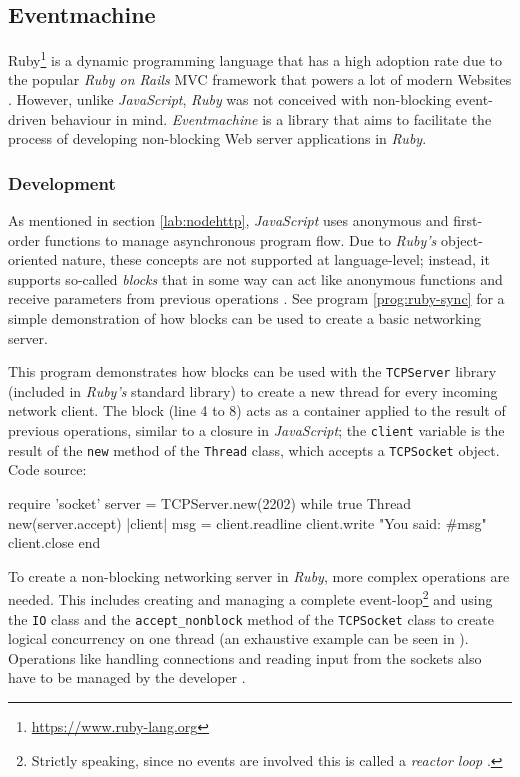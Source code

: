 \subsection{Eventmachine}
\label{sec:eventmachine}
Ruby\footnote{\url{https://www.ruby-lang.org}} is a dynamic programming language that has a high adoption rate due to the popular \textit{Ruby on Rails} MVC framework that powers a lot of modern Websites \cite[p. 11]{Orsini2008}. However, unlike \textit{JavaScript}, \textit{Ruby} was not conceived with non-blocking event-driven behaviour in mind. \textit{Eventmachine} is a library that aims to facilitate the process of developing non-blocking Web server applications in \textit{Ruby}.

\subsubsection*{Development}
As mentioned in section \ref{lab:nodehttp}, \textit{JavaScript} uses anonymous and first-order functions to manage asynchronous program flow. Due to \textit{Ruby's} object-oriented nature, these concepts are not supported at language-level; instead, it supports so-called \textit{blocks} that in some way can act like anonymous functions and receive parameters from previous operations \cite{Fitzgerald2007}. See program \ref{prog:ruby-sync} for a simple demonstration of how blocks can be used to create a basic networking server.

\begin{program}
  \caption{This program demonstrates how blocks can be used with the \texttt{TCPServer} library (included in \textit{Ruby's} standard library) to create a new thread for every incoming network client. The block (line 4 to 8) acts as a container applied to the result of previous operations, similar to a closure in \textit{JavaScript}; the \texttt{client} variable is the result of the \texttt{new} method of the \texttt{Thread} class, which accepts a \texttt{TCPSocket} object. Code source: \cite {Gupta2010}}
  \label{prog:ruby-sync}
  \begin{JavaCode}
require 'socket'
server = TCPServer.new(2202)
while true
    Thread new(server.accept){ |client|
        msg = client.readline
        client.write "You said: #{msg}"
        client.close
    }
end
  \end{JavaCode}
\end{program}

To create a non-blocking networking server in \textit{Ruby}, more complex operations are needed. This includes creating and managing a complete event-loop\footnote{Strictly speaking, since no events are involved this is called a \textit{reactor loop} \cite{Gupta2010}.} and using the \texttt{IO} class and the \texttt{accept\_nonblock} method of the \texttt{TCPSocket} class to create logical concurrency on one thread (an exhaustive example can be seen in \cite{Gupta2010}). Operations like handling connections and reading input from the sockets also have to be managed by the developer \cite{Gupta2010}.


